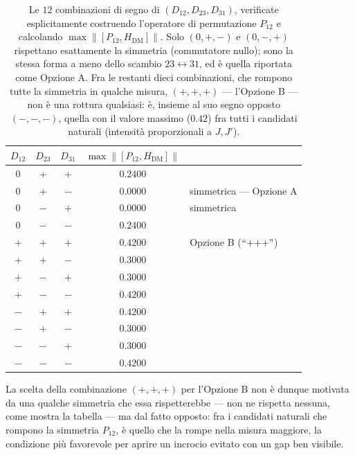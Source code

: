 \documentclass[11pt,a4paper]{article}
\begin{document}
\begin{table}[htbp]
\centering
\renewcommand{\arraystretch}{1.25}
\begin{tabular}{@{}cccc l@{}}
\toprule
\rowcolor{grigetto}
$D_{12}$ & $D_{23}$ & $D_{31}$ & $\max\lVert[P_{12},H_\text{DM}]\rVert$ & \\
\midrule
$0$ & $+$ & $+$ & $0.2400$ & \\
$0$ & $+$ & $-$ & $0.0000$ & simmetrica --- Opzione A \\
$0$ & $-$ & $+$ & $0.0000$ & simmetrica \\
$0$ & $-$ & $-$ & $0.2400$ & \\
$+$ & $+$ & $+$ & $0.4200$ & Opzione B ($``{+}{+}{+}"$) \\
$+$ & $+$ & $-$ & $0.3000$ & \\
$+$ & $-$ & $+$ & $0.3000$ & \\
$+$ & $-$ & $-$ & $0.4200$ & \\
$-$ & $+$ & $+$ & $0.4200$ & \\
$-$ & $+$ & $-$ & $0.3000$ & \\
$-$ & $-$ & $+$ & $0.3000$ & \\
$-$ & $-$ & $-$ & $0.4200$ & \\
\bottomrule
\end{tabular}
\caption{Le $12$ combinazioni di segno di $(D_{12},D_{23},D_{31})$,
verificate esplicitamente costruendo l'operatore di permutazione
$P_{12}$ e calcolando $\max\lVert[P_{12},H_\text{DM}]\rVert$. Solo
$(0,{+},{-})$ e $(0,{-},{+})$ rispettano esattamente la simmetria
(commutatore nullo); sono la stessa forma a meno dello scambio
$23\leftrightarrow31$, ed è quella riportata come Opzione A. Fra le
restanti dieci combinazioni, che rompono tutte la simmetria in qualche
misura, $({+},{+},{+})$ --- l'Opzione B --- non è una rottura qualsiasi:
è, insieme al suo segno opposto $(-,-,-)$, quella con il valore massimo
($0.42$) fra tutti i candidati naturali (intensità proporzionali a
$J,J'$).}
\label{tab:dm-segni}
\end{table}
\FloatBarrier

La scelta della combinazione $({+},{+},{+})$ per l'Opzione B non è
dunque motivata da una qualche simmetria che essa rispetterebbe --- non
ne rispetta nessuna, come mostra la tabella --- ma dal fatto opposto:
fra i candidati naturali che rompono la simmetria $P_{12}$, è quello che
la rompe nella misura maggiore, la condizione più favorevole per aprire
un incrocio evitato con un gap ben visibile.
\end{document}

